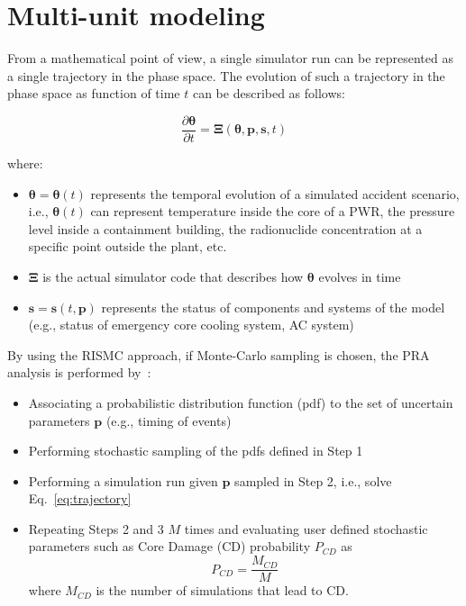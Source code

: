 \section{Multi-unit modeling}
\label{sec:multiUnitModeling}

From a mathematical point of view, a single simulator run can be represented 
as a single trajectory in the phase space. The evolution of such a trajectory 
in the phase space as function of time $t$ can be described as follows:

\begin{equation}
    \frac{\partial \boldsymbol \theta }{\partial t}  = \boldsymbol \Xi (\boldsymbol \theta , \boldsymbol p, \boldsymbol s , t) 
    \label{eq:trajectory}
\end{equation}

where:
\begin{itemize}
  \item $\boldsymbol \theta = \boldsymbol \theta(t)$ represents the temporal 
        evolution of a simulated accident scenario, i.e., $\boldsymbol \theta(t)$ can 
        represent temperature inside the core of a PWR, the pressure level inside a containment
        building, the radionuclide concentration at a specific point outside the plant, etc.
  \item $\boldsymbol \Xi$ is the actual simulator code that describes how $\boldsymbol \theta$ 
        evolves in time
  \item $\boldsymbol s = \boldsymbol s(t,\boldsymbol p)$ represents the status of components 
        and systems of the model (e.g., status of emergency core cooling system, AC system)
\end{itemize}

By using the RISMC approach, if Monte-Carlo sampling is chosen, the PRA analysis is performed 
by~\cite{BWR_SBO_Mandelli}:
\begin{itemize}
  \item Associating a probabilistic distribution function (pdf) to the set of uncertain 
        parameters $\boldsymbol p$ (e.g., timing of events)
  \item Performing stochastic sampling of the pdfs defined in Step 1
  \item Performing a simulation run given $\boldsymbol p$ sampled in Step 2, i.e., solve Eq.~\ref{eq:trajectory}
  \item Repeating Steps 2 and 3 $M$ times and evaluating user defined stochastic parameters such as 
        Core Damage (CD) probability $P_{CD}$ as
        \begin{equation}
            P_{CD} = \frac{M_{CD}}{M} 
            \label{eq:CDprobability}
        \end{equation}
        where $M_{CD}$ is the number of simulations that lead to CD. 
\end{itemize}

